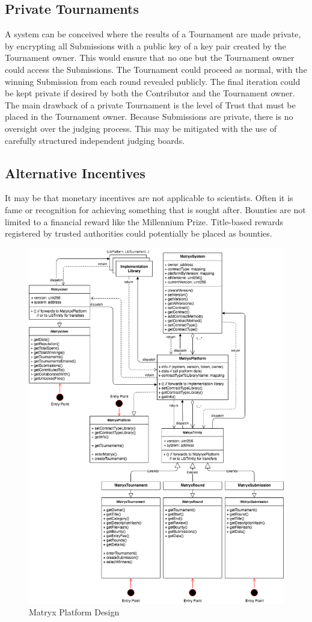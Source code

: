 \documentclass[a4paper, 10pt, conference]{ieeeconf}      %
\begin{document}
\subsection{Private Tournaments}\label{privateTournaments}
A system can be conceived where the results of a Tournament are made private, by encrypting all Submissions with a public key of a key pair created by the Tournament owner. 
This would ensure that no one but the Tournament owner could access the Submissions. 
The Tournament could proceed as normal, with the winning Submission from each round revealed publicly. 
The final iteration could be kept private if desired by both the Contributor and the Tournament owner. 
The main drawback of a private Tournament is the level of Trust that must be placed in the Tournament owner. 
Because Submissions are private, there is no oversight over the judging process. 
This may be mitigated with the use of carefully structured independent judging boards.

\subsection{Alternative Incentives}\label{alternative incentives}
It may be that monetary incentives are not applicable to scientists. 
Often it is fame or recognition for achieving something that is sought after. 
Bounties are not limited to a financial reward like the Millennium Prize. 
Title-based rewards registered by trusted authorities could potentially be placed as bounties.

\printbibliography

\begin{figure}
\caption{Matryx Platform Design}
\label{Platformdesign}
\centering
\includegraphics[scale = .5]{../Figures/architecture.png}
\end{figure}
\end{document}
